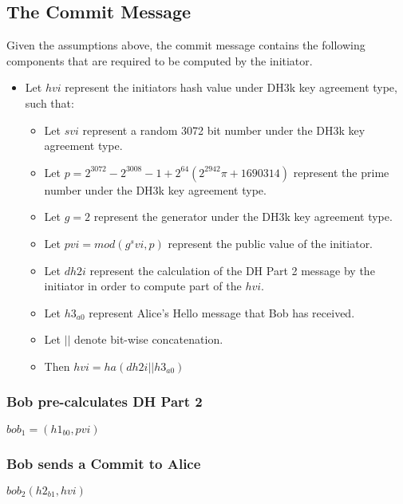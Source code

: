 \documentclass[11pt]{article}
\begin{document}
  \subsection{The Commit Message} \label{commit}
  Given the assumptions above, the commit message contains the following
  components that are required to be computed by the initiator.
  \begin{itemize}
    \item Let $hvi$ represent the initiators hash value under DH3k key
      agreement type, such that:
      \begin{itemize}
        \item Let $svi$ represent a random 3072 bit number under the DH3k key
              agreement type.
      \item Let $p = 2^{3072} - 2^{3008} - 1 + 2^{64}(2^{2942}\pi + 1690314)$ represent
              the prime number under the DH3k key agreement type.
        \item Let $g = 2$ represent the generator under the DH3k key agreement
              type.
        \item Let $pvi = mod(g^svi, p)$ represent the public value of the
              initiator. 
        \item Let $dh2i$ represent the calculation of the DH Part 2 message
              by the initiator in order to compute part of the $hvi$.
        \item Let $h3_{a0}$ represent Alice's Hello message that Bob has
              received.
        \item Let $||$ denote bit-wise concatenation.
        \item Then $hvi = ha(dh2i||h3_{a0})$ 
      \end{itemize}
  \end{itemize}
  \subsubsection{Bob pre-calculates DH Part 2}
  $bob_1=(h1_{b0},pvi)$
  \subsubsection{Bob sends a Commit to Alice}
  $bob_2(h2_{b1},hvi)$
\end{document}
